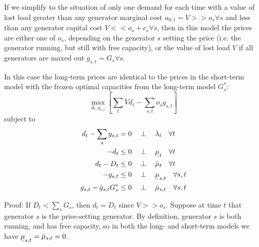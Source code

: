 \documentclass[final,3p,times]{elsarticle}
\newcommand{\ubar}[1]{\text{\b{$#1$}}}
\def\l{\lambda}
\begin{document}
If we simplify to the situation of only one demand for each time with
a value of lost load greater than any generator marginal cost $u_{0,t}
= V >> o_s \forall s$ and less than any generator capital cost $V <<
o_s + c_s \forall s$, then in this model the prices are either one of $o_s$,
depending on the generator $s$ setting the price (i.e. the generator
running, but still with free capacity), or the value of lost load $V$
if all generators are maxed out $g_{s,t} = G_s \forall s$.

In this case the long-term prices are identical to the prices in the short-term model with the frozen optimal capacities from the long-term model $G_{s}^*$:
\begin{equation}
    \max_{d_{t}, g_{s,t}}\left[\sum_{t} V d_{t}  - \sum_{s,t} o_{s} g_{s,t} \right]  \label{eq:objs}
\end{equation}
subject to
\begin{align}
   d_{t} - \sum_s g_{s,t} & =  0 \hspace{0.34cm}\perp \hspace{0.34cm} \l_t \hspace{0.34cm} \forall t \label{eq:balance2}\\
    -d_{t} & \leq 0 \hspace{0.34cm}\perp \hspace{0.34cm} \ubar{\mu}_{t} \hspace{0.34cm} \forall t  \nonumber \\
    d_{t} - D_{t} & \leq 0 \hspace{0.34cm}\perp \hspace{0.34cm} \bar{\mu}_{t} \hspace{0.34cm} \forall t\nonumber  \\
    -g_{s,t} & \leq 0 \hspace{0.34cm}\perp \hspace{0.34cm} \ubar{\mu}_{s,t} \hspace{0.34cm} \forall s,t \nonumber \\
         g_{s,t} - \bar{g}_{s,t} G^*_s & \leq 0 \hspace{0.34cm}\perp \hspace{0.34cm} \bar{\mu}_{s,t} \hspace{0.34cm} \forall s,t \label{eq:generation}
\end{align}

Proof: If $D_t < \sum_s G_{s}$, then $d_t = D_t$ since $V >> o_s$. Suppose at time $t$ that generator $s$ is the price-setting generator. By definition, generator $s$ is both running, and has free capacity, so in both the long- and short-term models we have $\ubar{\mu}_{s,t} = \bar{\mu}_{s,t} = 0$.
\end{document}
